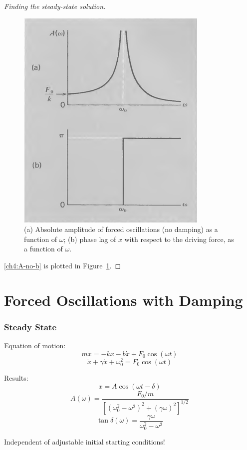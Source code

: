 \begin{proof}[Finding the steady-state solution]
\begin{figure}
	\centering
	\includegraphics[scale=0.7]{phys232/Ch4-forced-no-damping-A.png} \caption{(a) Absolute amplitude of forced oscillations (no damping) as a function of $\omega$; (b) phase lag of $x$ with respect to the driving force, as a function of $\omega$.}	\label{ch4:no-damping-A}
\end{figure}

\eqref{ch4:A-no-b} is plotted in Figure~\ref{ch4:no-damping-A}.

\end{proof}

\section{Forced Oscillations with Damping}

\subsubsection{Steady State}

Equation of motion:
\[ m\ddot{x} = -kx - b\dot{x} + F_0 \cos(\omega t) \]
\[ \ddot{x} + \gamma\dot{x} + \omega_0^2 = F_0 \cos(\omega t) \]

Results: 
\[ x = A \cos (\omega t - \delta) \]
\[ A(\omega) = \frac{F_0/m}{[(\omega_0^2 - \omega^2)^2 + (\gamma\omega)^2]^{1/2}} \]
\[ \tan \delta (\omega) = \frac{\gamma\omega}{\omega_0^2 - \omega^2}\]

Independent of adjustable initial starting conditions!

